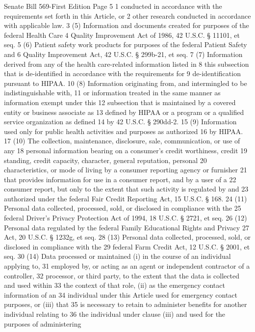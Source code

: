 Senate Bill 569-First Edition Page 5
1 conducted in accordance with the requirements set forth in this Article, or
2 other research conducted in accordance with applicable law.
3 (5) Information and documents created for purposes of the federal Health Care
4 Quality Improvement Act of 1986, 42 U.S.C. § 11101, et seq.
5 (6) Patient safety work products for purposes of the federal Patient Safety and
6 Quality Improvement Act, 42 U.S.C. § 299b-21, et seq.
7 (7) Information derived from any of the health care-related information listed in
8 this subsection that is de-identified in accordance with the requirements for
9 de-identification pursuant to HIPAA.
10 (8) Information originating from, and intermingled to be indistinguishable with,
11 or information treated in the same manner as information exempt under this
12 subsection that is maintained by a covered entity or business associate as
13 defined by HIPAA or a program or a qualified service organization as defined
14 by 42 U.S.C. § 290dd-2.
15 (9) Information used only for public health activities and purposes as authorized
16 by HIPAA.
17 (10) The collection, maintenance, disclosure, sale, communication, or use of any
18 personal information bearing on a consumer's credit worthiness, credit
19 standing, credit capacity, character, general reputation, personal
20 characteristics, or mode of living by a consumer reporting agency or furnisher
21 that provides information for use in a consumer report, and by a user of a
22 consumer report, but only to the extent that such activity is regulated by and
23 authorized under the federal Fair Credit Reporting Act, 15 U.S.C. § 168.
24 (11) Personal data collected, processed, sold, or disclosed in compliance with the
25 federal Driver's Privacy Protection Act of 1994, 18 U.S.C. § 2721, et seq.
26 (12) Personal data regulated by the federal Family Educational Rights and Privacy
27 Act, 20 U.S.C. § 1232g, et seq.
28 (13) Personal data collected, processed, sold, or disclosed in compliance with the
29 federal Farm Credit Act, 12 U.S.C. § 2001, et seq.
30 (14) Data processed or maintained (i) in the course of an individual applying to,
31 employed by, or acting as an agent or independent contractor of a controller,
32 processor, or third party, to the extent that the data is collected and used within
33 the context of that role, (ii) as the emergency contact information of an
34 individual under this Article used for emergency contact purposes, or (iii) that
35 is necessary to retain to administer benefits for another individual relating to
36 the individual under clause (iii) and used for the purposes of administering

